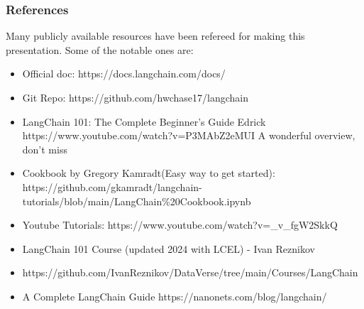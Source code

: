 \begin{frame}\frametitle{References}
Many publicly available resources have been refereed for making this presentation. Some of the notable ones are:
\footnotesize
\begin{itemize}
\item Official doc: https://docs.langchain.com/docs/
\item Git Repo: https://github.com/hwchase17/langchain
\item LangChain 101: The Complete Beginner's Guide Edrick https://www.youtube.com/watch?v=P3MAbZ2eMUI A wonderful overview, don't miss
\item Cookbook by Gregory Kamradt(Easy way to get started): https://github.com/gkamradt/langchain-tutorials/blob/main/LangChain\%20Cookbook.ipynb
\item Youtube Tutorials: https://www.youtube.com/watch?v=\_v\_fgW2SkkQ
\item LangChain 101 Course (updated 2024 with LCEL) - Ivan Reznikov
\item https://github.com/IvanReznikov/DataVerse/tree/main/Courses/LangChain
\item A Complete LangChain Guide https://nanonets.com/blog/langchain/
\end{itemize}

\end{frame}